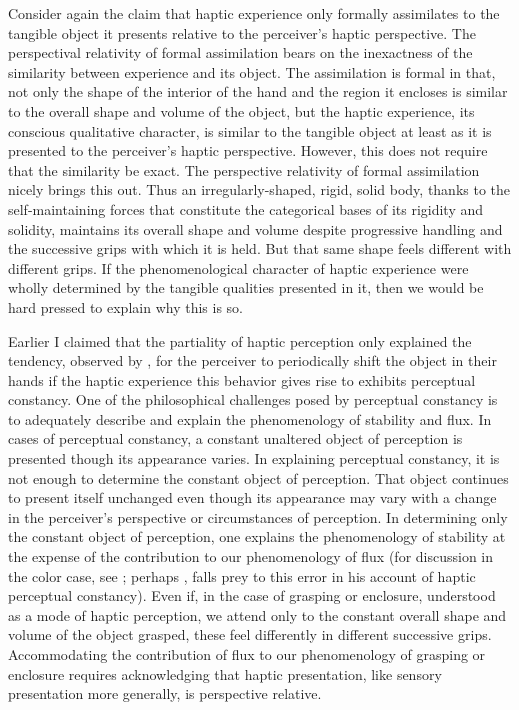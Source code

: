 Consider again the claim that haptic experience only formally assimilates to the tangible object it presents relative to the perceiver's haptic perspective. The perspectival relativity of formal assimilation bears on the inexactness of the similarity between experience and its object. The assimilation is formal in that, not only the shape of the interior of the hand and the region it encloses is similar to the overall shape and volume of the object, but the haptic experience, its conscious qualitative character, is similar to the tangible object at least as it is presented to the perceiver's haptic perspective. However, this does not require that the similarity be exact. The perspective relativity of formal assimilation nicely brings this out. Thus an irregularly-shaped, rigid, solid body, thanks to the self-maintaining forces that constitute the categorical bases of its rigidity and solidity, maintains its overall shape and volume despite progressive handling and the successive grips with which it is held. But that same shape feels different with different grips. If the phenomenological character of haptic experience were wholly determined by the tangible qualities presented in it, then we would be hard pressed to explain why this is so. 

Earlier I claimed that the partiality of haptic perception only explained the tendency, observed by \citet{Lederman:1987fr}, for the perceiver to periodically shift the object in their hands if the haptic experience this behavior gives rise to exhibits perceptual constancy. One of the philosophical challenges posed by perceptual constancy is to adequately describe and explain the phenomenology of stability and flux. In cases of perceptual constancy, a constant unaltered object of perception is presented though its appearance varies. In explaining perceptual constancy, it is not enough to determine the constant object of perception. That object continues to present itself unchanged even though its appearance may vary with a change in the perceiver's perspective or circumstances of perception. In determining only the constant object of perception, one explains the phenomenology of stability at the expense of the contribution to our phenomenology of flux (for discussion in the color case, see \citealt{Cohen:2008hc,Hilbert:2007qy}; perhaps \citealt[98]{Fulkerson:2014ek}, falls prey to this error in his account of haptic perceptual constancy). Even if, in the case of grasping or enclosure, understood as a mode of haptic perception, we attend only to the constant overall shape and volume of the object grasped, these feel differently in different successive grips. Accommodating the contribution of flux to our phenomenology of grasping or enclosure requires acknowledging that haptic presentation, like sensory presentation more generally, is perspective relative.

